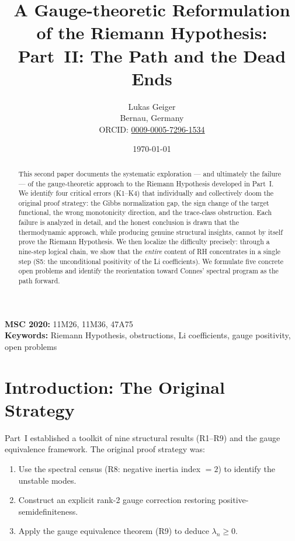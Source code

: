 \documentclass[12pt,a4paper]{article}
\title{A Gauge-theoretic Reformulation of the Riemann Hypothesis:\\
Part~II: The Path and the Dead Ends}
\author{Lukas Geiger\\
\small Bernau, Germany\\
\small ORCID: \href{https://orcid.org/0009-0005-7296-1534}{0009-0005-7296-1534}}
\date{\today}
\theoremstyle{definition}
\theoremstyle{remark}
\begin{document}
\maketitle

\begin{abstract}
This second paper documents the systematic exploration --- and ultimately the failure --- of the gauge-theoretic approach to the Riemann Hypothesis developed in Part~I. We identify four critical errors (K1--K4) that individually and collectively doom the original proof strategy: the Gibbs normalization gap, the sign change of the target functional, the wrong monotonicity direction, and the trace-class obstruction. Each failure is analyzed in detail, and the honest conclusion is drawn that the thermodynamic approach, while producing genuine structural insights, cannot by itself prove the Riemann Hypothesis. We then localize the difficulty precisely: through a nine-step logical chain, we show that the \emph{entire} content of RH concentrates in a single step (S5: the unconditional positivity of the Li coefficients). We formulate five concrete open problems and identify the reorientation toward Connes' spectral program as the path forward.
\end{abstract}

\noindent\textbf{MSC 2020:} 11M26, 11M36, 47A75\\
\textbf{Keywords:} Riemann Hypothesis, obstructions, Li coefficients, gauge positivity, open problems

\tableofcontents


\section{Introduction: The Original Strategy}
\label{sec:intro}

Part~I established a toolkit of nine structural results (R1--R9) and the gauge equivalence framework. The original proof strategy was:

\begin{enumerate}
  \item Use the spectral census (R8: negative inertia index $= 2$) to identify the unstable modes.
  \item Construct an explicit rank-2 gauge correction restoring positive-semidefiniteness.
  \item Apply the gauge equivalence theorem (R9) to deduce $\lambda_n \geq 0$.
\end{enumerate}
\end{document}
